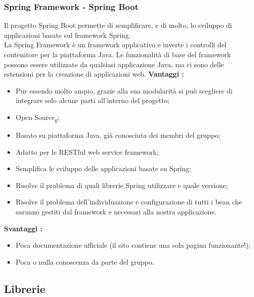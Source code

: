 {{		\subsubsection{Spring Framework - Spring Boot}{
			Il progetto Spring Boot permette di semplificare, e di molto, lo sviluppo di applicazioni basate sul framework Spring.\\
			La Spring Framework è un framework applicativo e inverte i controlli del contenitore per la piattaforma Java. Le funzionalità di base del framework possono essere utilizzate da qualsiasi applicazione Java, ma ci sono delle estensioni per la creazione di applicazioni web. 
			\textbf{Vantaggi :}
			\begin{itemize}\itemsep1pt
				\item Pur essendo molto ampio, grazie alla sua modularità si può scegliere di integrare solo alcune parti all'interno del progetto;
				\item Open Source\textsubscript{g};
				\item Basato su piattaforma Java, già conosciuta dei membri del gruppo;
				\item Adatto per le RESTful web service framework;
				\item Semplifica le sviluppo delle applicazioni basate su Spring;
				\item Risolve il problema di quali librerie Spring utilizzare e quale versione;
				\item Risolve il problema dell'individuazione e configurazione di tutti i bean che saranno gestiti dal framework e necessari alla nostra applicazione. 
			\end{itemize}
			\textbf{Svantaggi :}
			\begin{itemize}\itemsep1pt
				\item Poca documentazione ufficiale (il sito contiene una sola pagina funzionante!);
				\item Poca o nulla conoscenza da parte del gruppo.
			\end{itemize}
	}
	
	}
	\subsection{Librerie}{
}}
